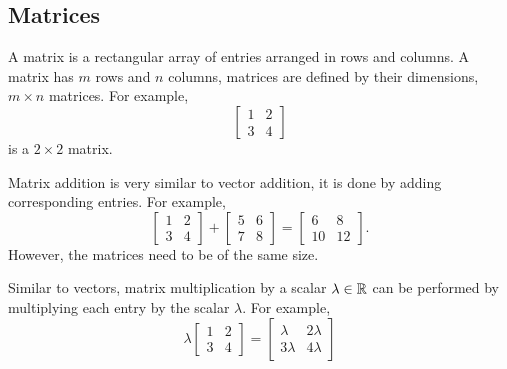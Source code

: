 \documentclass[10pt, a4paper]{article}
\begin{document}
\subsection{Matrices}
A matrix is a rectangular array of entries arranged in rows and columns. A matrix has $m$ rows and $n$ columns, matrices are defined by their dimensions, $m\times n$ matrices. For example,
\[
\begin{bmatrix}
    1 & 2 \\ 
    3 & 4
\end{bmatrix}
\]
is a $2\times 2$ matrix.

Matrix addition is very similar to vector addition, it is done by adding corresponding entries. For example,
\[
\begin{bmatrix}
    1 & 2 \\ 
    3 & 4
\end{bmatrix} + 
\begin{bmatrix}
    5 & 6 \\ 
    7 & 8
\end{bmatrix} = 
\begin{bmatrix}
    6 & 8 \\ 
    10 & 12
\end{bmatrix}.
\]
However, the matrices need to be of the same size.

Similar to vectors, matrix multiplication by a scalar $\lambda \in \mathbb{R}$ can be performed by multiplying each entry by the scalar $\lambda$. For example,
\[
\lambda\begin{bmatrix}
    1 & 2 \\ 
    3 & 4
\end{bmatrix} = \begin{bmatrix}
    \lambda & 2\lambda \\ 
    3\lambda & 4\lambda
\end{bmatrix}
\]
\end{document}
